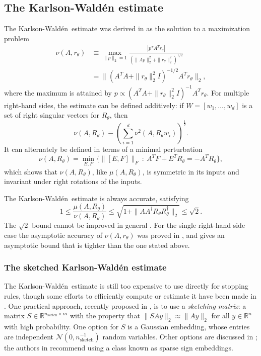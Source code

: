 \documentclass{article}
\newcommand{\ts}{^T}
\newcommand{\KW}{Karlson-Wald\'{e}n~}
\begin{document}
\subsection{The Karlson-Wald\'{e}n estimate}
The \KW estimate was derived in \cite[(2.6)]{karlson1997estimation} as the solution to a maximization problem
\begin{align*}
    \nu(A, r_\theta) &\equiv \max_{\|p\|_2=1} \frac{|p\ts A\ts r_\theta|}{(\|Ap\|_2^2 + \|r_\theta\|_2^2)^{1/2}} \\
    &= \|(A\ts A+\|r_\theta\|_2^2I)^{-1/2}A\ts r_\theta\|_2, \nonumber
\end{align*}
where the maximum is attained by $p\propto (A\ts A + \|r_\theta\|_2^2I)^{-1}A\ts r_\theta$. For multiple right-hand sides, the estimate can be defined additively: if $W=[w_1,\ldots,w_d]$ is a set of right singular vectors for $R_\theta$, then
\begin{equation}\label{def:kw_multiple_rhs}
    \nu(A, R_\theta) \equiv \left(\sum_{i=1}^d \nu^2(A, R_\theta w_i)\right)^{\frac{1}{2}}.
\end{equation}
It can alternately be defined in terms of a minimal perturbation \cite[(14)]{hallman2020estimating}
\begin{equation*}
    \nu(A, R_\theta) = \min_{E,F} \{\|[E,F]\|_F\ :\ A\ts F + E\ts R_\theta = -A\ts R_\theta\},
\end{equation*}
which shows that $\nu(A,R_\theta)$, like $\mu(A,R_\theta)$, is symmetric in its inputs and invariant under right rotations of the inputs.

The \KW estimate is always accurate, satisfying \cite[Thm.~4.8]{hallman2020estimating}
\begin{equation*}
    1 \leq \frac{\mu(A,R_\theta)}{\nu(A,R_\theta)} \leq \sqrt{1 + \|AA^\dagger R_\theta R_\theta ^\dagger\|_2} \leq \sqrt{2}. 
\end{equation*}
The $\sqrt{2}$ bound cannot be improved in general \cite{gratton2012accuracy}. For the single right-hand side case the asymptotic accuracy of $\nu(A,r_\theta)$ was proved in \cite[Thm.~4.8]{grcar2003optimal}, and \cite[Cor.~3.2]{gratton2012accuracy} gives an asymptotic bound that is tighter than the one stated above. 

\subsubsection{The sketched Karlson-Wald\'{e}n estimate}

The \KW estimate is still too expensive to use directly for stopping rules, though some efforts to efficiently compute or estimate it have been made in \cite{jiranek2010estimating, hallman2018lsmb, fong2011minimum}. One practical approach, recently proposed in \cite{epperly2026fast}, is to use a {\em sketching matrix}: a matrix $S\in \mathbb{R}^{n_{\text{sketch}}\times m}$ with the property that $\|SAy\|_2\approx \|Ay\|_2$ for all $y\in \mathbb{R}^n$ with high probability. One option for $S$ is a Gaussian embedding, whose entries are independent $\mathcal{N}(0,n_{\text{sketch}}^{-1})$ random variables. Other options are discussed in \cite{Martinsson_Tropp_2020}; the authors in \cite{epperly2026fast} recommend using a class known as sparse sign embeddings.
\end{document}
